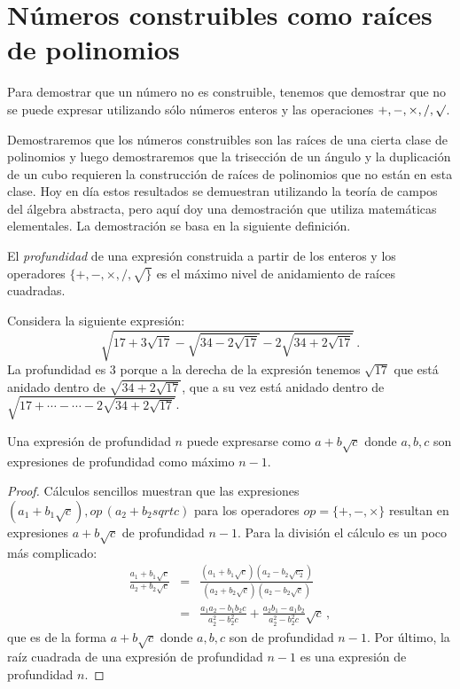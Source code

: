 
\section{Números construibles como raíces de polinomios}\label{s.trisect-poly}

Para demostrar que un número no es construible, tenemos que demostrar que no se puede expresar utilizando sólo números enteros y las operaciones $ {+,-,\times,/,\surd}$.

Demostraremos que los números construibles son las raíces de una cierta clase de polinomios y luego demostraremos que la trisección de un ángulo y la duplicación de un cubo requieren la construcción de raíces de polinomios que no están en esta clase. Hoy en día estos resultados se demuestran utilizando la teoría de campos del álgebra abstracta, pero aquí doy una demostración que utiliza matemáticas elementales. La demostración se basa en la siguiente definición.

\begin{definition}
El \emph{profundidad} de una expresión construida a partir de los enteros y los operadores $\{+,-,\times,/,\surd\}$ es el máximo nivel de anidamiento de raíces cuadradas.
\end{definition}

\begin{example}
Considera la siguiente expresión:
\[
\sqrt{17+3\sqrt{17} - \sqrt{34-2\sqrt{17}}
  -2\sqrt{34+2\sqrt{17}} }\,.
\]
La profundidad es $3$ porque a la derecha de la expresión tenemos $\sqrt{17}$ que está anidado dentro de $\sqrt{34+2\sqrt{17}}$, que a su vez está anidado dentro de $\sqrt{17+\cdots-\cdots-2\sqrt{34+2\sqrt{17}}}$.
\end{example}

\begin{theorem}
Una expresión de profundidad $n$ puede expresarse como $a+b\sqrt{c}$ donde $a,b,c$ son expresiones de profundidad como máximo $n-1$.
\end{theorem}
\begin{proof}
Cálculos sencillos muestran que las expresiones $(a_1+b_1\sqrt{c}),\mathit{op}\,(a_2+b_2sqrt{c})$ para los operadores $\mathit{op}=\{+,-,\times\}$ resultan en expresiones $a+b\sqrt{c}$ de profundidad $n-1$. Para la división el cálculo es un poco más complicado:
\begin{eqnarray*}
\frac{a_1+b_1\sqrt{c}}{a_2+b_2\sqrt{c}}&=&
\frac{(a_1+b_1\sqrt{c})(a_2-b_2\sqrt{c_2})}{(a_2+b_2\sqrt{c})(a_2-b_2\sqrt{c})}\\
&=&\frac{a_1a_2-b_1b_2c}{a_2^2-b_2^2c}+\frac{a_2b_1-a_1b_2}{a_2^2-b_2^2c}\sqrt{c}\,,
\end{eqnarray*}
que es de la forma $a+b\sqrt{c}$ donde $a,b,c$ son de profundidad $n-1$.
Por último, la raíz cuadrada de una expresión de profundidad $n-1$ es una expresión de profundidad $n$.
\end{proof}

